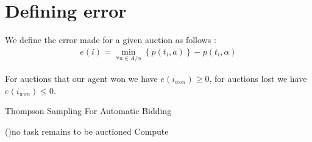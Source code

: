 \documentclass[11pt]{article}
\begin{document}
\section{Defining error}

We define the error made for a given auction as follows :
\begin{align}
    e(i) = \min_{\forall a \in A/ \alpha} \left\lbrace p(t_i,a) \right\rbrace - p(t_i,\alpha) 
\end{align}

For auctions that our agent won we have $e(i_{won})\geq 0$, for auctions lost we have $e(i_{won})\leq 0$. 




\begin{algorithm}[H]
    \SetAlgoLined
    \caption{Thompson Sampling For Automatic Bidding}
    \Repeat(){no task remains to be auctioned}{
        Compute 
    }
\end{algorithm}
\end{document}
